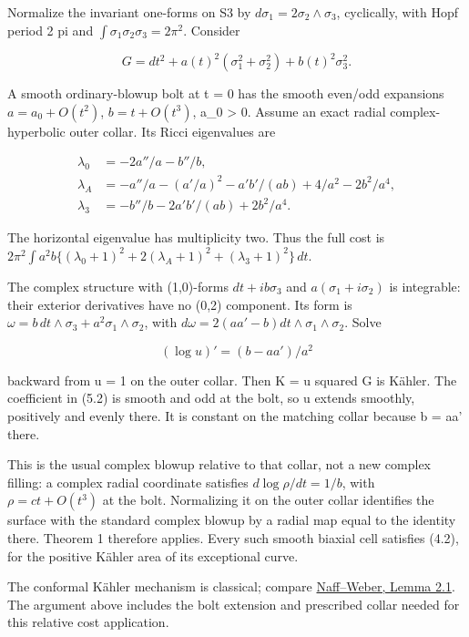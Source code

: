 \documentclass[
  10pt,
]{article}
\begin{document}
Normalize the invariant one-forms on S3 by
\(d\sigma_1=2\sigma_2\wedge\sigma_3\), cyclically, with Hopf period 2 pi
and \(\int\sigma_1\sigma_2\sigma_3=2\pi^2\). Consider

\[
 G=dt^2+a(t)^2(\sigma_1^2+\sigma_2^2)+b(t)^2\sigma_3^2.
\]

A smooth ordinary-blowup bolt at t = 0 has the smooth even/odd
expansions \(a=a_0+O(t^2)\), \(b=t+O(t^3)\), a\_0 \textgreater{} 0.
Assume an exact radial complex-hyperbolic outer collar. Its Ricci
eigenvalues are

\[
\begin{aligned}
 \lambda_0&=-2a''/a-b''/b,\\
 \lambda_A&=-a''/a-(a'/a)^2-a'b'/(ab)+4/a^2-2b^2/a^4,\\
 \lambda_3&=-b''/b-2a'b'/(ab)+2b^2/a^4.
\end{aligned}                                                    \tag{5.1}
\]

The horizontal eigenvalue has multiplicity two. Thus the full cost is
\(2\pi^2\int a^2b\{(\lambda_0+1)^2+2(\lambda_A+1)^2+ (\lambda_3+1)^2\}\,dt\).

The complex structure with (1,0)-forms \(dt+ib\sigma_3\) and
\(a(\sigma_1+i\sigma_2)\) is integrable: their exterior derivatives have
no (0,2) component. Its form is
\(\omega=b\,dt\wedge\sigma_3+a^2\sigma_1\wedge\sigma_2\), with
\(d\omega=2(aa'-b)dt\wedge\sigma_1\wedge\sigma_2\). Solve

\[
                 (\log u)'=(b-aa')/a^2                         \tag{5.2}
\]

backward from u = 1 on the outer collar. Then K = u squared G is Kähler.
The coefficient in (5.2) is smooth and odd at the bolt, so u extends
smoothly, positively and evenly there. It is constant on the matching
collar because b = aa' there.

This is the usual complex blowup relative to that collar, not a new
complex filling: a complex radial coordinate satisfies
\(d\log\rho/dt=1/b\), with \(\rho=ct+O(t^3)\) at the bolt. Normalizing
it on the outer collar identifies the surface with the standard complex
blowup by a radial map equal to the identity there. Theorem 1 therefore
applies. Every such smooth biaxial cell satisfies (4.2), for the
positive Kähler area of its exceptional curve.

The conformal Kähler mechanism is classical; compare
\href{https://arxiv.org/pdf/2111.11150}{Naff--Weber, Lemma 2.1}. The
argument above includes the bolt extension and prescribed collar needed
for this relative cost application.
\end{document}
